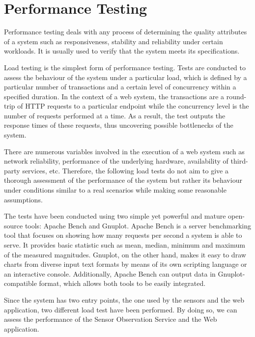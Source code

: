\chapter{Performance Testing}

Performance testing deals with any process of determining the quality attributes of a system such as responsiveness, stability and reliability under certain workloads. It is usually used to verify that the system meets its specifications.

Load testing is the simplest form of performance testing. Tests are conducted to assess the behaviour of the system under a particular load, which is defined by a particular number of transactions and a certain level of concurrency within a specified duration. In the context of a web system, the transactions are a round-trip of HTTP requests to a particular endpoint while the concurrency level is the number of requests performed at a time. As a result, the test outputs the response times of these requests, thus uncovering possible bottlenecks of the system.

There are numerous variables involved in the execution of a web system such as network reliability, performance of the underlying hardware, availability of third-party services, etc. Therefore, the following load tests do not aim to give a thorough assessment of the performance of the system but rather its behaviour under conditions similar to a real scenarios while making some reasonable assumptions.

The tests have been conducted using two simple yet powerful and mature open-source tools: Apache Bench and Gnuplot. Apache Bench is a server benchmarking tool that focuses on showing how many requests per second a system is able to serve. It provides basic statistic such as mean, median, minimum and maximum of the measured magnitudes. Gnuplot, on the other hand, makes it easy to draw charts from diverse input text formats by means of its own scripting language or an interactive console. Additionally, Apache Bench can output data in Gnuplot-compatible format, which allows both tools to be easily integrated.

Since the system has two entry points, the one used by the sensors and the web application, two different load test have been performed. By doing so, we can assess the performance of the Sensor Observation Service and the Web application.

